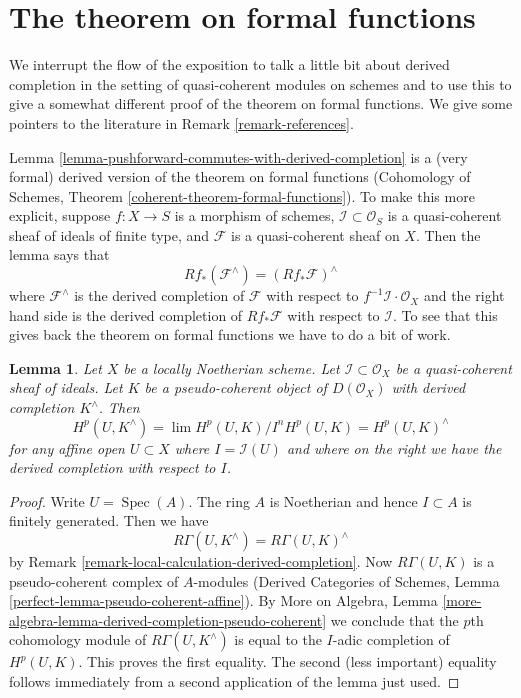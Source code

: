 \documentclass{stacks-project}
\theoremstyle{plain}
\newtheorem{lemma}[subsection]{Lemma}
\theoremstyle{definition}
\theoremstyle{remark}
\numberwithin{equation}{subsection}
\def\lim{\mathop{\mathrm{lim}}\nolimits}
\def\Spec{\mathop{\mathrm{Spec}}}
\begin{document}
\section{The theorem on formal functions}
\label{section-formal-functions}

\noindent
We interrupt the flow of the exposition to talk a little bit about
derived completion in the setting of quasi-coherent modules on schemes
and to use this to give a somewhat different proof of the theorem on
formal functions. We give some pointers to the literature in
Remark \ref{remark-references}.

\medskip\noindent
Lemma \ref{lemma-pushforward-commutes-with-derived-completion} is a
(very formal) derived version of the theorem on formal functions
(Cohomology of Schemes, Theorem \ref{coherent-theorem-formal-functions}).
To make this more explicit, suppose $f : X \to S$ is a morphism of schemes,
$\mathcal{I} \subset \mathcal{O}_S$ is a quasi-coherent sheaf of ideals
of finite type,
and $\mathcal{F}$ is a quasi-coherent sheaf on $X$. Then the lemma says that
\begin{equation}
\label{equation-formal-functions}
Rf_*(\mathcal{F}^\wedge) = (Rf_*\mathcal{F})^\wedge
\end{equation}
where $\mathcal{F}^\wedge$ is the derived completion of $\mathcal{F}$
with respect to $f^{-1}\mathcal{I} \cdot \mathcal{O}_X$ and the right
hand side is the derived completion of $Rf_*\mathcal{F}$
with respect to $\mathcal{I}$. To see that this gives back the theorem
on formal functions we have to do a bit of work.

\begin{lemma}
\label{lemma-sections-derived-completion-pseudo-coherent}
Let $X$ be a locally Noetherian scheme. Let $\mathcal{I} \subset \mathcal{O}_X$
be a quasi-coherent sheaf of ideals. Let $K$ be a
pseudo-coherent object of $D(\mathcal{O}_X)$ with derived completion
$K^\wedge$. Then
$$
H^p(U, K^\wedge) = \lim H^p(U, K)/I^nH^p(U, K) =
H^p(U, K)^\wedge
$$
for any affine open $U \subset X$
where $I = \mathcal{I}(U)$ and where on the right we have the derived
completion with respect to $I$.
\end{lemma}

\begin{proof}
Write $U = \Spec(A)$. The ring $A$ is Noetherian
and hence $I \subset A$ is finitely generated. Then we have
$$
R\Gamma(U, K^\wedge) = R\Gamma(U, K)^\wedge
$$
by Remark \ref{remark-local-calculation-derived-completion}.
Now $R\Gamma(U, K)$ is a pseudo-coherent complex of $A$-modules
(Derived Categories of Schemes, Lemma
\ref{perfect-lemma-pseudo-coherent-affine}).
By More on Algebra, Lemma
\ref{more-algebra-lemma-derived-completion-pseudo-coherent}
we conclude that the $p$th cohomology module of $R\Gamma(U, K^\wedge)$
is equal to the $I$-adic completion of $H^p(U, K)$.
This proves the first equality. The second (less important) equality
follows immediately from a second application of the lemma just used.
\end{proof}
\end{document}
